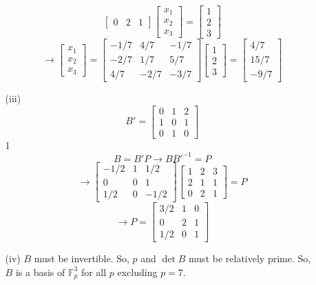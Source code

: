 \begin{itemize}
\begin{itemize}
$$\begin{bmatrix}
0 & 2 & 1
\end{bmatrix}\begin{bmatrix}
x_1 \\
x_2 \\
x_3
\end{bmatrix} = \begin{bmatrix}
1 \\
2 \\
3
\end{bmatrix}$$
$$\rightarrow \begin{bmatrix}
x_1 \\
x_2 \\
x_3
\end{bmatrix} = \begin{bmatrix}
-1/7 & 4/7 & -1/7 \\
-2/7 & 1/7 & 5/7 \\
4/7 & -2/7 & -3/7
\end{bmatrix}\begin{bmatrix}
1 \\
2 \\
3
\end{bmatrix} = \begin{bmatrix}
4/7 \\
15/7 \\
-9/7
\end{bmatrix}$$
\item[(iii)]
$$B' = \begin{bmatrix}
0 & 1 & 2 \\
1 & 0 & 1 \\
0 & 1 & 0
\end{bmatrix}$$1
$$B = B'P \rightarrow BB'^{-1} = P$$
$$\rightarrow \begin{bmatrix}
-1/2 & 1 & 1/2 \\
0 & 0 & 1 \\
1/2 & 0 & -1/2
\end{bmatrix}\begin{bmatrix}
1 & 2 & 3 \\
2 & 1 & 1 \\
0 & 2 & 1
\end{bmatrix} = P$$
$$\rightarrow P = \begin{bmatrix}
3/2 & 1 & 0 \\
0 & 2 & 1 \\
1/2 & 0 & 1
\end{bmatrix}$$
\item[(iv)]
$B$ must be invertible. So, $p$ and $\det B$ must be relatively prime. So, $B$ is a basis of $\mathbb{F}_p^3$ for all $p$ excluding $p = 7$.

\end{itemize}
\end{itemize}
